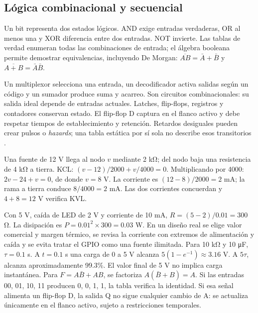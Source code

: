 \subsection{Lógica combinacional y secuencial}
Un bit representa dos estados lógicos. AND exige entradas verdaderas, OR al menos una y XOR diferencia entre dos entradas. NOT invierte. Las tablas de verdad enumeran todas las combinaciones de entrada; el álgebra booleana permite demostrar equivalencias, incluyendo De Morgan: $\overline{AB}=\bar A+\bar B$ y $\overline{A+B}=\bar A\bar B$.

Un multiplexor selecciona una entrada, un decodificador activa salidas según un código y un sumador produce suma y acarreo. Son circuitos combinacionales: su salida ideal depende de entradas actuales. Latches, flip-flops, registros y contadores conservan estado. El flip-flop D captura en el flanco activo y debe respetar tiempos de establecimiento y retención. Retardos desiguales pueden crear pulsos o \emph{hazards}; una tabla estática por sí sola no describe esos transitorios \cite[proyectos 1--3]{digital}.

Una fuente de 12 V llega al nodo $v$ mediante 2 kΩ; del nodo baja una resistencia de 4 kΩ a tierra. KCL: $(v-12)/2000+v/4000=0$. Multiplicando por 4000: $2v-24+v=0$, de donde $v=8$ V. La corriente es $(12-8)/2000=2$ mA; la rama a tierra conduce $8/4000=2$ mA. Las dos corrientes concuerdan y $4+8=12$ V verifica KVL.

\begin{center}
\end{center}
Con 5 V, caída de LED de 2 V y corriente de 10 mA, $R=(5-2)/0.01=300$ Ω. La disipación es $P=0.01^2\times300=0.03$ W. En un diseño real se elige valor comercial y margen térmico, se revisa la corriente con extremos de alimentación y caída y se evita tratar el GPIO como una fuente ilimitada.
Para 10 kΩ y 10 μF, $\tau=0.1$ s. A $t=0.1$ s una carga de 0 a 5 V alcanza $5(1-e^{-1})\approx3.16$ V. A $5\tau$, alcanza aproximadamente 99.3\%. El valor final de 5 V no implica carga instantánea.
Para $F=A\bar B+AB$, se factoriza $A(\bar B+B)=A$. Si las entradas 00, 01, 10, 11 producen 0, 0, 1, 1, la tabla verifica la identidad. Si esa señal alimenta un flip-flop D, la salida Q no sigue cualquier cambio de A: se actualiza únicamente en el flanco activo, sujeto a restricciones temporales.

